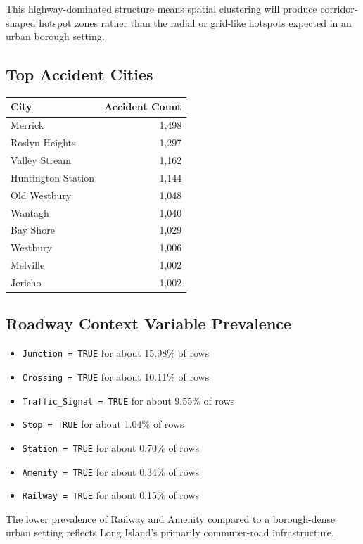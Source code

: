 \documentclass[11pt]{article}
\begin{document}
This highway-dominated structure means spatial clustering will produce corridor-shaped hotspot zones rather than the radial or grid-like hotspots expected in an urban borough setting.

\subsection{Top Accident Cities}

\begin{center}
\begin{tabular}{|l|r|}
\hline
City & Accident Count \\
\hline
Merrick & 1,498 \\
Roslyn Heights & 1,297 \\
Valley Stream & 1,162 \\
Huntington Station & 1,144 \\
Old Westbury & 1,048 \\
Wantagh & 1,040 \\
Bay Shore & 1,029 \\
Westbury & 1,006 \\
Melville & 1,002 \\
Jericho & 1,002 \\
\hline
\end{tabular}
\end{center}

\subsection{Roadway Context Variable Prevalence}

\begin{itemize}
\item \texttt{Junction = TRUE} for about 15.98\% of rows
\item \texttt{Crossing = TRUE} for about 10.11\% of rows
\item \texttt{Traffic\_Signal = TRUE} for about 9.55\% of rows
\item \texttt{Stop = TRUE} for about 1.04\% of rows
\item \texttt{Station = TRUE} for about 0.70\% of rows
\item \texttt{Amenity = TRUE} for about 0.34\% of rows
\item \texttt{Railway = TRUE} for about 0.15\% of rows
\end{itemize}

The lower prevalence of Railway and Amenity compared to a borough-dense urban setting reflects Long Island's primarily commuter-road infrastructure.
\end{document}
